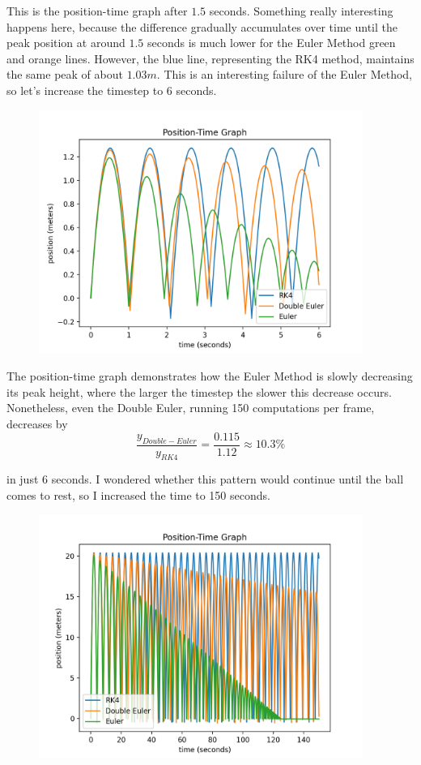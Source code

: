 \documentclass[12pt]{article}
\begin{document}
This is the position-time graph after $1.5$ seconds. Something really interesting happens here, because the difference gradually accumulates over time until the peak position at around $1.5$ seconds is much lower for the Euler Method green and orange lines. However, the blue line, representing the RK4 method, maintains the same peak of about $1.03m$. This is an interesting failure of the Euler Method, so let's increase the timestep to $6$ seconds. 

\begin{figure}[H]
\centering
\includegraphics[width=300pt]{img/energy_loss.png}
\caption{\label{fig:1}}
\end{figure}

The position-time graph demonstrates how the Euler Method is slowly decreasing its peak height, where the larger the timestep the slower this decrease occurs. Nonetheless, even the Double Euler, running 150 computations per frame, decreases by 
$$\frac{y_{Double-Euler}}{y_{RK4}} = \frac{0.115}{1.12} \approx 10.3\%$$

in just 6 seconds. I wondered whether this pattern would continue until the ball comes to rest, so I increased the time to 150 seconds. 

\begin{figure}[H]
\centering
\includegraphics[width=300pt]{img/super_long.png}
\caption{\label{fig:1}}
\end{figure}
\end{document}
